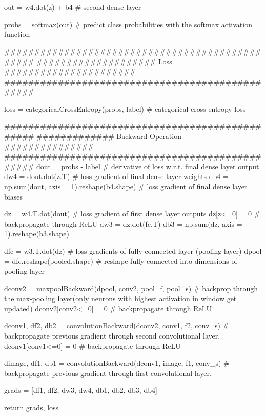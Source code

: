     out = w4.dot(z) + b4 # second dense layer
     
    probs = softmax(out) # predict class probabilities with the softmax activation function
    
    ################################################
    #################### Loss ######################
    ################################################
    
    loss = categoricalCrossEntropy(probs, label) # categorical cross-entropy loss
        
    ################################################
    ############# Backward Operation ###############
    ################################################
    dout = probs - label # derivative of loss w.r.t. final dense layer output
    dw4 = dout.dot(z.T) # loss gradient of final dense layer weights
    db4 = np.sum(dout, axis = 1).reshape(b4.shape) # loss gradient of final dense layer biases
    
    dz = w4.T.dot(dout) # loss gradient of first dense layer outputs 
    dz[z<=0] = 0 # backpropagate through ReLU 
    dw3 = dz.dot(fc.T)
    db3 = np.sum(dz, axis = 1).reshape(b3.shape)
    
    dfc = w3.T.dot(dz) # loss gradients of fully-connected layer (pooling layer)
    dpool = dfc.reshape(pooled.shape) # reshape fully connected into dimensions of pooling layer
    
    dconv2 = maxpoolBackward(dpool, conv2, pool_f, pool_s) # backprop through the max-pooling layer(only neurons with highest activation in window get updated)
    dconv2[conv2<=0] = 0 # backpropagate through ReLU
    
    dconv1, df2, db2 = convolutionBackward(dconv2, conv1, f2, conv_s) # backpropagate previous gradient through second convolutional layer.
    dconv1[conv1<=0] = 0 # backpropagate through ReLU
    
    dimage, df1, db1 = convolutionBackward(dconv1, image, f1, conv_s) # backpropagate previous gradient through first convolutional layer.
    
    grads = [df1, df2, dw3, dw4, db1, db2, db3, db4] 
    
    return grads, loss
\stoptyping
\stopsubsection


